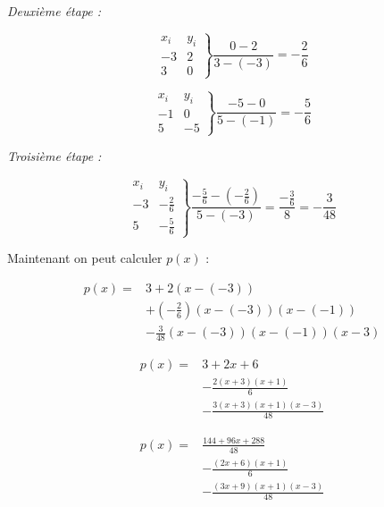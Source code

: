 \documentclass[12pt, letterpaper]{article}
\begin{document}
\textit{Deuxième étape :}

$$
\left.
\begin{array}{ll}
  x_i & y_i \\
  -3 & 2 \\
  3 & 0
\end{array}
\right\}
\frac{0 - 2}{3 -(- 3)} = -\frac{2}{6}
$$

$$
\left.
\begin{array}{ll}
  x_i & y_i \\
  -1 & 0 \\
  5 & -5
\end{array}
\right\}
\frac{-5 - 0}{5 -(- 1)} = -\frac{5}{6}
$$

\textit{Troisième étape :}

$$
\left.
\begin{array}{ll}
  x_i & y_i \\
  -3 & -\frac{2}{6} \\
  5 & -\frac{5}{6}
\end{array}
\right\}
\frac{-\frac{5}{6} - (-\frac{2}{6})}{5 -(- 3)} =
\frac{-\frac{3}{6}}{8} = -\frac{3}{48}
$$

Maintenant on peut calculer $p(x)$ :

\begin{equation*}
\begin{split}
  p(x) = & 3 + 2(x - (-3)) \\
         & + (-\frac{2}{6})(x - (-3))(x - (-1)) \\
         & -\frac{3}{48}(x - (-3))(x - (-1))(x - 3)
\end{split}
\end{equation*}

\begin{equation*}
\begin{split}
  p(x) = & 3 + 2x + 6 \\
         & -\frac{2(x + 3)(x + 1)}{6} \\
         & -\frac{3(x + 3)(x + 1)(x - 3)}{48}
\end{split}
\end{equation*}

\begin{equation*}
\begin{split}
  p(x) = & \frac{144 + 96x + 288}{48} \\
         & -\frac{(2x + 6)(x + 1)}{6} \\
         & -\frac{(3x + 9)(x + 1)(x - 3)}{48}
\end{split}
\end{equation*}
\end{document}
